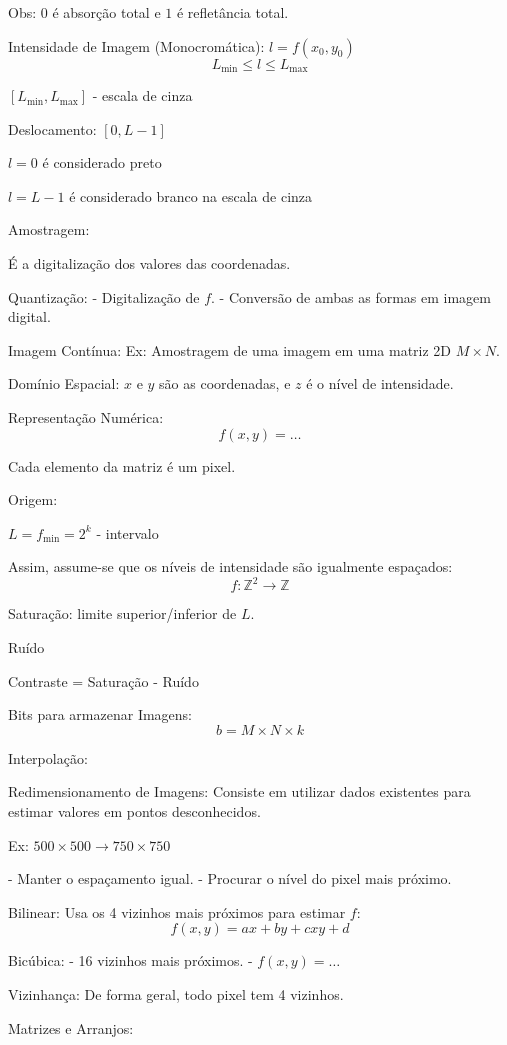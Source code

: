 \documentclass[a4paper,12pt]{report}
\begin{document}
	Obs: $0$ é absorção total e $1$ é refletância total.
	
	Intensidade de Imagem (Monocromática):
	$l = f(x_0, y_0)$
	$$L_{\min} \leq l \leq L_{\max}$$
	
	$[L_{\min}, L_{\max}]$ - escala de cinza
	
	Deslocamento: $[0, L-1]$
	
	$l=0$ é considerado preto
	
	$l=L-1$ é considerado branco na escala de cinza
	
	
	Amostragem:
	
	É a digitalização dos valores das coordenadas.
	
	
	Quantização:
	- Digitalização de $f$.
	- Conversão de ambas as formas em imagem digital.
	
	Imagem Contínua:
	Ex: Amostragem de uma imagem em uma matriz 2D $M \times N$.
	
	Domínio Espacial:
	$x$ e $y$ são as coordenadas, e $z$ é o nível de intensidade.
	
	Representação Numérica:
	$$f(x,y) = \dots$$
	
	Cada elemento da matriz é um pixel.
	
	Origem:
	
	$L = f_{\min} = 2^k$ - intervalo
	
	Assim, assume-se que os níveis de intensidade são igualmente espaçados:
	$$f: \mathbb{Z}^2 \to \mathbb{Z}$$
	
	Saturação: limite superior/inferior de $L$.
	
	Ruído
	
	Contraste = Saturação - Ruído
	
	Bits para armazenar Imagens:
	$$b = M \times N \times k$$
	
	Interpolação:
	
	Redimensionamento de Imagens:
	Consiste em utilizar dados existentes para estimar valores em pontos desconhecidos.
	
	Ex: $500 \times 500 \to 750 \times 750$
	
	- Manter o espaçamento igual.
	- Procurar o nível do pixel mais próximo.
	
	Bilinear:
	Usa os 4 vizinhos mais próximos para estimar $f$:
	$$f(x,y) = ax + by + cxy + d$$
	
	Bicúbica:
	- 16 vizinhos mais próximos.
	- $f(x,y) = \dots$
	
	Vizinhança:
	De forma geral, todo pixel tem 4 vizinhos.
	
	Matrizes e Arranjos:
	
\end{document}
